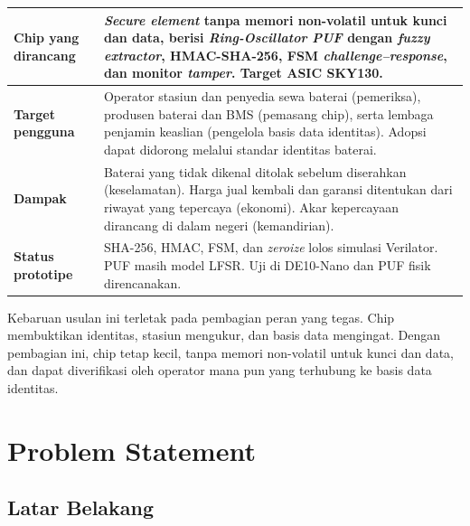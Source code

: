 \documentclass[11pt,a4paper]{article}
\newcommand{\hdr}[1]{\cellcolor{hdrgreen}\textbf{#1}}
\renewcommand{\arraystretch}{1.3}
\begin{document}
\begin{center}
\small
\renewcommand{\arraystretch}{1.12}
\begin{tabularx}{\linewidth}{|>{\raggedright\arraybackslash}p{3.1cm}|X|}
\hline
\hdr{Chip yang dirancang} & \emph{Secure element} tanpa memori non-volatil untuk kunci dan data, berisi \emph{Ring-Oscillator PUF} dengan \emph{fuzzy extractor}, HMAC-SHA-256, FSM \emph{challenge--response}, dan monitor \emph{tamper}. Target ASIC SKY130. \\ \hline
\hdr{Target pengguna} & Operator stasiun dan penyedia sewa baterai (pemeriksa), produsen baterai dan BMS (pemasang chip), serta lembaga penjamin keaslian (pengelola basis data identitas). Adopsi dapat didorong melalui standar identitas baterai. \\ \hline
\hdr{Dampak} & Baterai yang tidak dikenal ditolak sebelum diserahkan (keselamatan). Harga jual kembali dan garansi ditentukan dari riwayat yang tepercaya (ekonomi). Akar kepercayaan dirancang di dalam negeri (kemandirian). \\ \hline
\hdr{Status prototipe} & SHA-256, HMAC, FSM, dan \emph{zeroize} lolos simulasi Verilator. PUF masih model LFSR. Uji di DE10-Nano dan PUF fisik direncanakan. \\ \hline
\end{tabularx}
\end{center}

Kebaruan usulan ini terletak pada pembagian peran yang tegas. Chip membuktikan identitas, stasiun mengukur, dan basis data mengingat. Dengan pembagian ini, chip tetap kecil, tanpa memori non-volatil untuk kunci dan data, dan dapat diverifikasi oleh operator mana pun yang terhubung ke basis data identitas.


\section{Problem Statement}

\subsection{Latar Belakang}
\end{document}
